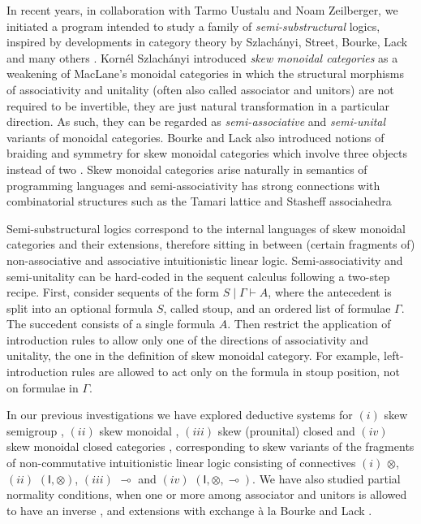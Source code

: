 \documentclass[submission,copyright,creativecommons]{eptcs}
\theoremstyle{definition}
\newcommand{\lolli}{\multimap}
\newcommand{\I}{\mathsf{I}}
\begin{document}
In recent years, in collaboration with Tarmo Uustalu and Noam Zeilberger, we initiated a program intended to study a family of \emph{semi-substructural} logics, inspired by developments in category theory by Szlach{\'a}nyi, Street, Bourke, Lack and many others \cite{szlachanyi:skew-monoidal:2012,lack:skew:2012,street:skew-closed:2013,lack:triangulations:2014,buckley:catalan:2015,bourke:skew:2017,bourke:skew:2018,bourke:lack:braided:2020}. Korn{\'e}l Szlach\'anyi introduced \emph{skew monoidal categories} as a weakening of MacLane's monoidal categories in which the structural morphisms of associativity and unitality (often also called associator and unitors) are not required to be invertible, they are just natural transformation in a particular direction. As such, they can be regarded as \emph{semi-associative} and \emph{semi-unital} variants of monoidal categories. Bourke and Lack also introduced notions of braiding and symmetry for skew monoidal categories which involve three objects instead of two \cite{bourke:lack:braided:2020}. Skew monoidal categories arise naturally in semantics of programming languages \cite{altenkirch:monads:2014} and semi-associativity has strong connections with combinatorial structures such as the Tamari lattice and Stasheff associahedra \cite{zeilberger:semiassociative:19,moortgat:tamari:20}

Semi-substructural logics correspond to the internal languages of skew monoidal categories and their extensions, therefore sitting in between (certain fragments of) non-associative and associative intuitionistic linear logic. Semi-associativity and semi-unitality can be hard-coded in the sequent calculus following a two-step recipe. First, consider sequents of the form $S \mid \Gamma \vdash A$, where the antecedent is split into an optional formula $S$, called stoup, and an ordered list of formulae $\Gamma$. The succedent consists of a single formula $A$. Then restrict the application of introduction rules to allow only one of the directions of associativity and unitality, the one in the definition of skew monoidal category. For example, left-introduction rules are allowed to act only on the formula in stoup position, not on formulae in $\Gamma$.

In our previous investigations we have explored deductive systems for $(i)$ skew semigroup \cite{zeilberger:semiassociative:19}, $(ii)$ skew monoidal \cite{uustalu:sequent:2021}, $(iii)$ skew (prounital) closed \cite{uustalu:deductive:nodate} and $(iv)$ skew monoidal closed categories \cite{UVW:protsn}, corresponding to skew variants of the fragments of non-commutative intuitionistic linear logic consisting of connectives $(i)$ $\otimes$, $(ii)$ $(\I,\otimes)$, $(iii)$ $\lolli$ and $(iv)$ $(\I,\otimes,\lolli)$. We have also studied partial normality conditions, when one or more among associator and unitors is allowed to have an inverse \cite{uustalu:proof:nodate}, and extensions with exchange {\`a} la Bourke and Lack \cite{veltri:coherence:2021}.
\end{document}

